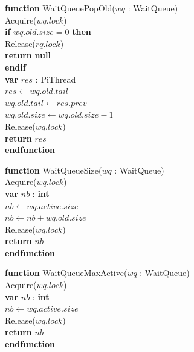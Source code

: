 \documentclass[a4paper,11pt]{article}
\newenvironment{program}{
  \begin{sffamily}
  \begin{scriptsize}
  \begin{tabbing}}
 {\end{tabbing}
  \end{scriptsize}
  \end{sffamily}}
\newcommand{\kw}[1]{\textsf{\textbf{#1}}}
\newcommand{\pindent}{\hspace{2em}\=}
\newcommand{\synchro}[1]{\textcolor{synchrocolor}{#1}}
\begin{document}
\label{WaitQueuePopOld}
\begin{program}
  \kw{function} WaitQueuePopOld($wq$ : WaitQueue) \\
  \pindent\synchro{Acquire($wq.lock$)} \\
  \>\kw{if} $wq.old.size = 0$ \kw{then} \\
  \>\pindent\synchro{Release($rq.lock$)} \\
  \>\>\kw{return} \kw{null} \\
  \>\kw{endif} \\
  \>\kw{var} $res$ : PiThread \\
  \>$res \leftarrow wq.old.tail$ \\
  \>$wq.old.tail \leftarrow res.prev$ \\
  \>$wq.old.size \leftarrow wq.old.size - 1$ \\
  \>\synchro{Release($wq.lock$)} \\
  \>\kw{return} $res$ \\
  \kw{endfunction}
\end{program}

\label{WaitQueueSize}
\begin{program}
  \kw{function} WaitQueueSize($wq$ : WaitQueue) \\
  \pindent\synchro{Acquire($wq.lock$)} \\
  \>\kw{var} $nb$ : \kw{int} \\
  \>$nb \leftarrow wq.active.size$ \\
  \>$nb \leftarrow nb + wq.old.size$ \\
  \>\synchro{Release($wq.lock$)} \\
  \>\kw{return} $nb$ \\
  \kw{endfunction}
\end{program}

\label{WaitQueueMaxActive}
\begin{program}
  \kw{function} WaitQueueMaxActive($wq$ : WaitQueue) \\
  \pindent\synchro{Acquire($wq.lock$)} \\
  \>\kw{var} $nb$ : \kw{int} \\
  \>$nb \leftarrow wq.active.size$ \\
  \>\synchro{Release($wq.lock$)} \\
  \>\kw{return} $nb$ \\
  \kw{endfunction}
\end{program}
\end{document}
